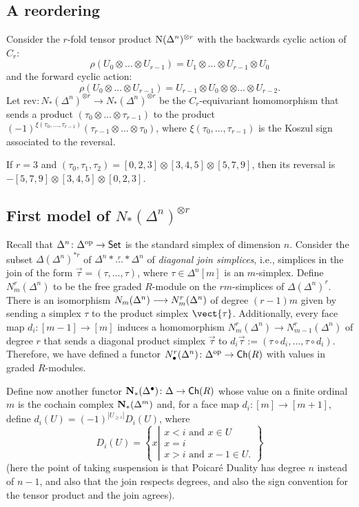 \subsection{A reordering} Consider the $r$-fold tensor product $\operatorname{N}(\Delta^n)^{\otimes r}$ with the backwards cyclic action of $C_r$:
\[\rho(U_0\otimes \ldots\otimes U_{r-1}) = U_1\otimes \ldots \otimes U_{r-1}\otimes U_0\]
and the forward cyclic action:
\[\rho(U_0\otimes \ldots\otimes U_{r-1}) = U_{r-1}\otimes U_0\otimes \otimes \ldots \otimes U_{r-2}.\]
Let $\mathrm{rev}\colon N_*(\Delta^n)^{\otimes r}\to N_*(\Delta^n)^{\otimes r}$ be the $C_r$-equivariant homomorphism that sends a product $(\tau_0\otimes\ldots\otimes \tau_{r-1})$ to the product $(-1)^{\xi(\tau_{0},\ldots,\tau_{r-1})}(\tau_{r-1}\otimes\ldots\otimes \tau_0)$, where $\xi(\tau_0,\ldots,\tau_{r-1})$ is the Koszul sign associated to the reversal. 
\begin{example}\label{ex:101}
    If $r=3$ and $(\tau_0,\tau_1,\tau_2) = [0,2,3]\otimes [3,4,5] \otimes [5,7,9]$, then its reversal is $-[5,7,9]\otimes [3,4,5]\otimes [0,2,3]$.
\end{example}


\subsection{First model of $N_*(\Delta^n)^{\otimes r}$} Recall that $\Delta^n\colon \Delta^{\mathrm{op}}\to \mathsf{Set}$ is the standard simplex of dimension $n$. Consider the subset $\Delta(\Delta^n)^{*r}$ of $\Delta^n* \overset{r}{\ldots}* \Delta^n$ of \emph{diagonal join simplices}, i.e., simplices in the join of the form $\vec{\tau} = (\tau,\ldots,\tau)$, where $\tau\in \Delta^n[m]$ is an $m$-simplex. Define $N_m^r(\Delta^n)$ to be the free graded $R$-module on the $rm$-simplices of $\Delta(\Delta^n)^r$. There is an isomorphism $N_m(\Delta^n)\longrightarrow N_m^r(\Delta^n)$ of degree $(r-1)m$ given by sending a simplex $\tau$ to the product simplex $\vect{\tau}$. Additionally, every face map $d_i\colon [m-1]\to [m]$ induces a homomorphism $N_m^r(\Delta^n)\to N_{m-1}^r(\Delta^n)$ of degree $r$ that sends a diagonal product simplex $\vec{\tau}$ to $d_i\vec{\tau}:= (\tau\circ d_i,\ldots,\tau\circ d_i)$. Therefore, we have defined a functor $N_\bullet^r(\Delta^n)\colon \Delta^{\mathrm{op}}\to \mathsf{Ch}(R)$ with values in graded $R$-modules.

Define now another functor $\mathbf{N}_*(\Delta^\bullet)\colon \Delta\to \mathsf{Ch}(R)$ whose value on a finite ordinal $m$ is the cochain complex $\mathbf{N}_*(\Delta^m)$ and, for a face map $d_i\colon [m]\to [m+1]$, define $d_i(U) = (-1)^{|U_{\geq i}|}D_i(U)$, where 
\[D_i(U) = \left\{
x\left| \begin{array}{l}
x<i \text{ and } x\in U \\
x=i \\
x>i \text{ and } x-1 \in U.
\end{array}\right.
\right\}
\]
(here the point of taking suspension is that Poicaré Duality has degree $n$ instead of $n-1$, and also that the join respects degrees, and also the sign convention for the tensor product and the join agrees).


